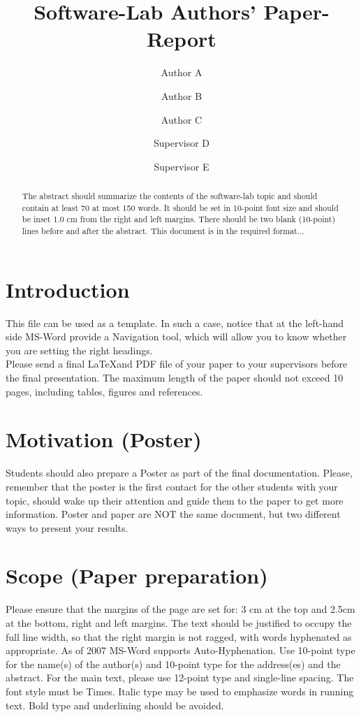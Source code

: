 \documentclass[12pt]{article}
\title{Software-Lab Authors' Paper-Report}
\author[1]{Author A}
\author[1]{Author B}
\author[1]{Author C}
\author[1]{Supervisor D}
\author[2]{Supervisor E}
\affil[1]{Chair, University}
\affil[2]{Department, Company}
\begin{document}
\maketitle

\begin{abstract}The abstract should summarize the contents of the software-lab topic and should contain at least 70 at most 150 words. It should be set in 10-point font size and should be inset 1.0 cm from the right and left margins. There should be two blank (10-point) lines before and after the abstract. This document is in the required format...
\end{abstract}


\section{Introduction}
This file can be used as a template. In such a case, notice that at the left-hand side MS-Word provide a Navigation tool, which will allow you to know whether you are setting the right headings.\\

Please send a final \LaTeX and PDF file of your paper to your supervisors before the final presentation. The maximum length of the paper should not exceed 10 pages, including tables, figures and references. 

\section{Motivation (Poster)}
Students should also prepare a Poster as part of the final documentation. Please, remember that the poster is the first contact for the other students with your topic, should wake up their attention and guide them to the paper to get more information. Poster and paper are NOT the same document, but two different ways to present your results.

\section{Scope (Paper preparation)}

Please ensure that the margins of the page are set for: 3 cm at the top and 2.5cm at the bottom, right and left margins. The text should be justified to occupy the full line width, so that the right margin is not ragged, with words hyphenated as appropriate. As of 2007 MS-Word supports Auto-Hyphenation.
Use 10-point type for the name(s) of the author(s) and 10-point type for the address(es) and the abstract. For the main text, please use 12-point type and single-line spacing. The font style must be Times. Italic type may be used to emphasize words in running text. Bold type and underlining should be avoided. 
\end{document}
